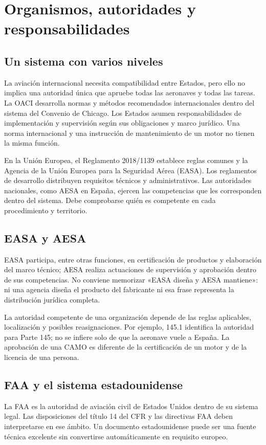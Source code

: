 \chapter{Organismos, autoridades y responsabilidades}\label{ch:13}
\section{Un sistema con varios niveles}
La aviación internacional necesita compatibilidad entre Estados, pero ello no implica una autoridad única que apruebe todas las aeronaves y todas las tareas. La OACI desarrolla normas y métodos recomendados internacionales dentro del sistema del Convenio de Chicago. Los Estados asumen responsabilidades de implementación y supervisión según sus obligaciones y marco jurídico. Una norma internacional y una instrucción de mantenimiento de un motor no tienen la misma función.

En la Unión Europea, el Reglamento 2018/1139 establece reglas comunes y la Agencia de la Unión Europea para la Seguridad Aérea (EASA). Los reglamentos de desarrollo distribuyen requisitos técnicos y administrativos. Las autoridades nacionales, como AESA en España, ejercen las competencias que les corresponden dentro del sistema. Debe comprobarse quién es competente en cada procedimiento y territorio.
\section{EASA y AESA}
EASA participa, entre otras funciones, en certificación de productos y elaboración del marco técnico; AESA realiza actuaciones de supervisión y aprobación dentro de sus competencias. No conviene memorizar «EASA diseña y AESA mantiene»: ni una agencia diseña el producto del fabricante ni esa frase representa la distribución jurídica completa.

La autoridad competente de una organización depende de las reglas aplicables, localización y posibles reasignaciones. Por ejemplo, 145.1 identifica la autoridad para Parte 145; no se infiere solo de que la aeronave vuele a España. La aprobación de una CAMO es diferente de la certificación de un motor y de la licencia de una persona.
\section{FAA y el sistema estadounidense}
La FAA es la autoridad de aviación civil de Estados Unidos dentro de su sistema legal. Las disposiciones del título 14 del CFR y las directivas FAA deben interpretarse en ese ámbito. Un documento estadounidense puede ser una fuente técnica excelente sin convertirse automáticamente en requisito europeo.

